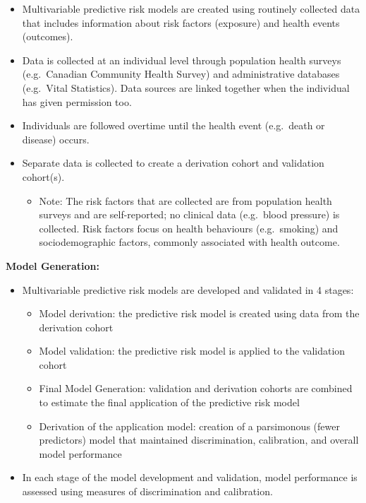 \documentclass[]{book}
\providecommand{\tightlist}{%
  \setlength{\itemsep}{0pt}\setlength{\parskip}{0pt}}
\begin{document}
\begin{itemize}
\item
  Multivariable predictive risk models are created using routinely
  collected data that includes information about risk factors (exposure)
  and health events (outcomes).
\item
  Data is collected at an individual level through population health
  surveys (e.g.~Canadian Community Health Survey) and administrative
  databases (e.g.~Vital Statistics). Data sources are linked together
  when the individual has given permission too.
\item
  Individuals are followed overtime until the health event (e.g.~death
  or disease) occurs.
\item
  Separate data is collected to create a derivation cohort and
  validation cohort(s).

  \begin{itemize}
  \tightlist
  \item
    Note: The risk factors that are collected are from population health
    surveys and are self-reported; no clinical data (e.g.~blood
    pressure) is collected. Risk factors focus on health behaviours
    (e.g.~smoking) and sociodemographic factors, commonly associated
    with health outcome.
  \end{itemize}
\end{itemize}

\textbf{Model Generation:}

\begin{itemize}
\item
  Multivariable predictive risk models are developed and validated in 4
  stages:

  \begin{itemize}
  \tightlist
  \item
    Model derivation: the predictive risk model is created using data
    from the derivation cohort
  \item
    Model validation: the predictive risk model is applied to the
    validation cohort
  \item
    Final Model Generation: validation and derivation cohorts are
    combined to estimate the final application of the predictive risk
    model
  \item
    Derivation of the application model: creation of a parsimonous
    (fewer predictors) model that maintained discrimination,
    calibration, and overall model performance
  \end{itemize}
\item
  In each stage of the model development and validation, model
  performance is assessed using measures of discrimination and
  calibration.
\end{itemize}
\end{document}
